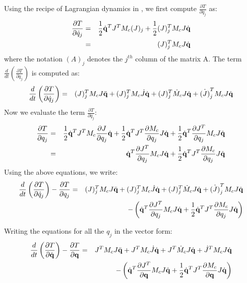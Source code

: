 Using the recipe of Lagrangian dynamics in , we first compute $\frac{\partial T}{\partial \dot{q}_j}$ as:
\begin{eqnarray}
\nonumber
\frac{\partial T}{\partial \dot{q}_j} & = & \frac{1}{2}\dot{\mathbf{q}}^T J^T M_c (J)_j + \frac{1}{2} (J)_j^T M_c J \dot{\mathbf{q}}\\
 & = & (J)_j^T M_c J \dot{\mathbf{q}}
\end{eqnarray}
where the notation $(A)_j$ denotes the $j^{th}$ column of the matrix A. The term $\frac{d}{dt} \left( \frac{\partial T}{\partial \dot{q}_j} \right )$ is computed as:
\begin{eqnarray}
\label{eq:lagterm1}
\frac{d}{dt} \left ( \frac{\partial T}{\partial \dot{q}_j} \right ) & = & (J)_j^T M_c J \ddot{\mathbf{q}} + (J)_j^T M_c \dot{J} \dot{\mathbf{q}} + (J)_j^T \dot{M}_c J \dot{\mathbf{q}} + \dot{(J)}_j^T M_c J \dot{\mathbf{q}}
\end{eqnarray}
Now we evaluate the term $\frac{\partial T}{\partial q_j}$:
\begin{eqnarray}
\nonumber
\frac{\partial T}{\partial q_j} & = & \frac{1}{2}\dot{\mathbf{q}}^T J^T M_c \frac{\partial J}{\partial q_j} \dot{\mathbf{q}} + \frac{1}{2}\dot{\mathbf{q}}^T J^T \frac{\partial M_c}{\partial q_j} J \dot{\mathbf{q}} + \frac{1}{2}\dot{\mathbf{q}}^T \frac{\partial J^T}{\partial q_j} M_c J \dot{\mathbf{q}}\\
\label{eq:lagterm2}
& = & \dot{\mathbf{q}}^T \frac{\partial J^T}{\partial q_j} M_c J \dot{\mathbf{q}} + \frac{1}{2}\dot{\mathbf{q}}^T J^T \frac{\partial M_c}{\partial q_j} J \dot{\mathbf{q}}
\end{eqnarray}
Using the above equations, we write:
\begin{eqnarray}
\nonumber
\frac{d}{dt} \left ( \frac{\partial T}{\partial \dot{q}_j} \right ) - \frac{\partial T}{\partial q_j} & = & (J)_j^T M_c J \ddot{\mathbf{q}} + (J)_j^T M_c \dot{J} \dot{\mathbf{q}} + (J)_j^T \dot{M}_c J \dot{\mathbf{q}} + \dot{(J)}_j^T M_c J \dot{\mathbf{q}} \\ & & - \left( \dot{\mathbf{q}}^T \frac{\partial J^T}{\partial q_j} M_c J \dot{\mathbf{q}} + \frac{1}{2}\dot{\mathbf{q}}^T J^T \frac{\partial M_c}{\partial q_j} J \dot{\mathbf{q}} \right )
\end{eqnarray}

Writing the equations for all the $q_j$ in the vector form:
\begin{eqnarray}
\nonumber
\frac{d}{dt} \left ( \frac{\partial T}{\partial \dot{\mathbf{q}}} \right ) - \frac{\partial T}{\partial \mathbf{q}} & = & J^T M_c J \ddot{\mathbf{q}} + J^T M_c \dot{J} \dot{\mathbf{q}} + J^T \dot{M}_c J \dot{\mathbf{q}} + \dot{J}^T M_c J \dot{\mathbf{q}}\\
& & - \left( \dot{\mathbf{q}}^T \frac{\partial J^T}{\partial \mathbf{q}} M_c J \dot{\mathbf{q}} + \frac{1}{2}\dot{\mathbf{q}}^T J^T \frac{\partial M_c}{\partial \mathbf{q}} J \dot{\mathbf{q}} \right )
\end{eqnarray}

